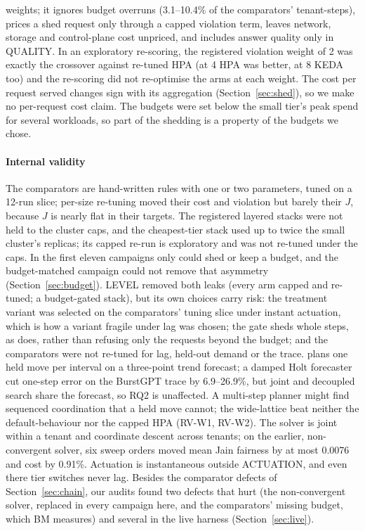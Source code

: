 weights; it ignores budget overruns (3.1--10.4\% of the comparators'
tenant-steps), prices a shed request only through a capped violation term,
leaves network, storage and control-plane cost unpriced, and includes
answer quality only in QUALITY. In an exploratory re-scoring, the registered
violation weight of 2 was exactly the crossover against re-tuned HPA (at 4
HPA was better, at 8 KEDA too) and the re-scoring did not re-optimise the
arms at each weight. The cost per request served changes sign with its
aggregation (Section~\ref{sec:shed}), so we make no per-request cost claim.
The budgets were set below the small tier's peak spend for several
workloads, so part of the shedding is a property of the budgets we chose.

\paragraph{Internal validity}
The comparators are hand-written rules with one or two parameters, tuned
on a 12-run slice; per-size re-tuning moved their cost and violation but
barely their $J$, because $J$ is nearly flat in their targets. The
registered layered stacks were not held to the cluster caps, and the
cheapest-tier stack used up to twice the small cluster's replicas; its
capped re-run is exploratory and was not re-tuned under the caps. In the
first eleven campaigns only \jcac{} could shed or keep a budget, and the
budget-matched campaign could not remove that asymmetry
(Section~\ref{sec:budget}). LEVEL removed both leaks (every arm capped and
re-tuned; a budget-gated stack), but its own choices carry risk: the
treatment variant was selected on the comparators' tuning slice under
instant actuation, which is how a variant fragile under lag was chosen; the
gate sheds whole steps, as \jcac{} does, rather than refusing only the
requests beyond the budget; and the comparators were not re-tuned for lag,
held-out demand or the trace. \jcac{} plans one held move
per interval on a three-point trend forecast; a damped Holt forecaster cut
one-step error on the BurstGPT trace by 6.9--26.9\%, but joint and
decoupled search share the forecast, so RQ2 is unaffected. A multi-step
planner might find sequenced coordination that a held move cannot; the
wide-lattice \jcac{} beat neither the default-behaviour nor the capped HPA
(RV-W1, RV-W2). The solver is joint within a tenant and coordinate descent
across tenants; on the earlier, non-convergent solver, six sweep orders moved
mean Jain fairness by at most 0.0076 and cost by 0.91\%. Actuation is
instantaneous outside ACTUATION, and even there tier switches never lag.
Besides the comparator defects of Section~\ref{sec:chain}, our audits found
two defects that hurt \jcac{} (the non-convergent solver, replaced in every
campaign here, and the comparators' missing budget, which BM measures) and
several in the live harness (Section~\ref{sec:live}).

